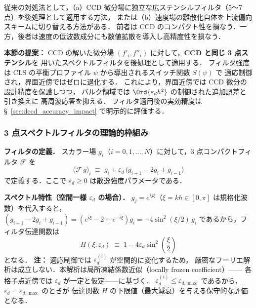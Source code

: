 従来の対処法として，（a）CCD 微分場に独立な広ステンシルフィルタ（5〜7 点）を後処理として適用する方法，
または（b）速度場の離散化自体を上流偏向スキームに切り替える方法がある．
前者は CCD のコンパクト性を損なう．一方，後者は速度の低波数成分にも数値拡散を導入し高精度性を損なう．

\textbf{本節の提案：}
CCD の解いた微分場 $(f'_i, f''_i)$ に対して，\textbf{CCD と同じ 3 点ステンシル}を
用いたスペクトルフィルタを後処理として適用する．
フィルタ強度は CLS の平衡プロファイル $\psi$ から導出されるスイッチ関数 $S(\psi)$ で
適応制御され，界面近傍ではゼロに退化する．
これにより，界面近傍では CCD 微分の設計精度を保護しつつ，
バルク領域では $\Ord{\varepsilon_d h^2}$ の制御された追加誤差と引き換えに
高周波応答を抑える．
フィルタ適用後の実効精度は §~\ref{sec:dccd_accuracy_impact} で明示的に評価する．

\subsubsection{3 点スペクトルフィルタの理論的枠組み}
\label{sec:dccd_filter_theory}

\textbf{フィルタの定義．}
スカラー場 $g_i$（$i = 0, 1, \ldots, N$）に対して，3 点コンパクトフィルタ $\mathcal{F}$ を
\begin{equation}
  \bigl(\mathcal{F}\,g\bigr)_i
  \;\equiv\;
  g_i + \varepsilon_d\,\bigl(g_{i+1} - 2g_i + g_{i-1}\bigr)
  \label{eq:dccd_filter}
\end{equation}
で定義する．ここで $\varepsilon_d \geq 0$ は散逸強度パラメータである．

\textbf{スペクトル特性（空間一様 $\varepsilon_d$ の場合）．}
$g_j = e^{ij\xi}$（$\xi = kh \in [0,\pi]$ は規格化波数）を代入すると，
$(g_{i+1}-2g_i+g_{i-1}) = (e^{i\xi}-2+e^{-i\xi})g_i = -4\sin^2(\xi/2)\,g_i$
であるから，フィルタ伝達関数は
\begin{equation}
  H(\xi;\varepsilon_d)
  \;\equiv\;
  1 - 4\varepsilon_d\sin^2\!\left(\frac{\xi}{2}\right)
  \label{eq:dccd_transfer}
\end{equation}
となる．
\textbf{注：} 適応制御では $\varepsilon_d^{(i)}$ が空間的に変化するため，
厳密なフーリエ解析は成立しない．本解析は局所凍結係数近似（locally frozen coefficient）——
各格子点近傍では $\varepsilon_d$ が一定と仮定——に基づく．
$\varepsilon_d^{(i)} \leq \varepsilon_{d,\max}$ であるから，$\varepsilon_d = \varepsilon_{d,\max}$ のときが
伝達関数 $H$ の下限値（最大減衰）を与える保守的な評価となる．

